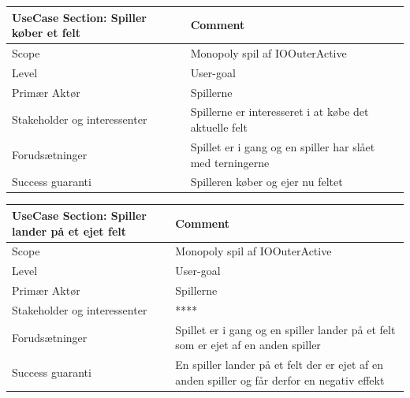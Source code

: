 \begin{center}
\begin{tabular}{ | m{10em} | m{10cm}| }
        \hline
            UseCase Section: Spiller køber et felt & Comment\\
        \hline
            Scope & Monopoly spil af IOOuterActive\\
        \hline
            Level & User-goal\\
        \hline
            Primær Aktør & Spillerne\\
        \hline
            Stakeholder og interessenter & Spillerne er interesseret i at købe det aktuelle felt\\
        \hline
            Forudsætninger & Spillet er i gang og en spiller har slået med terningerne\\
        \hline
            Success guaranti & Spilleren køber og ejer nu feltet\\
        \hline
    \end{tabular}
\end{center}

\begin{center}
\begin{tabular}{ | m{10em} | m{10cm}| }
        \hline
            UseCase Section: Spiller lander på et ejet felt & Comment\\
        \hline
            Scope & Monopoly spil af IOOuterActive\\
        \hline
            Level & User-goal\\
        \hline
            Primær Aktør & Spillerne\\
        \hline
            Stakeholder og interessenter & ****\\
        \hline
            Forudsætninger & Spillet er i gang og en spiller lander på et felt som er ejet af en anden spiller\\
        \hline
            Success guaranti & En spiller lander på et felt der er ejet af en anden spiller og får derfor en negativ effekt\\
        \hline
    \end{tabular}
\end{center}

